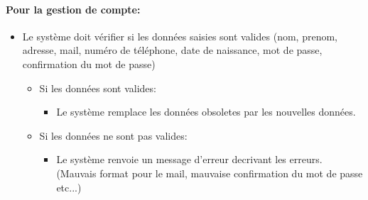 \documentclass{article}
\begin{document}
\paragraph{Pour la gestion de compte: }
\begin{itemize}
\item Le système doit vérifier si les données saisies sont valides (nom, prenom, adresse, mail, numéro de téléphone, date de naissance,
 mot de passe, confirmation du mot de passe)
	\begin{itemize}
	\item Si les données sont valides:
		\begin{itemize}
		\item Le système remplace les données obsoletes par les nouvelles données.
		\end{itemize}
		\item Si les données ne sont pas valides:
		\begin{itemize}
		\item Le système renvoie un message d'erreur decrivant les erreurs. (Mauvais format pour le mail, mauvaise confirmation du mot de passe etc...)
		\end{itemize}
	\end{itemize}

\end{itemize}
\end{document}
